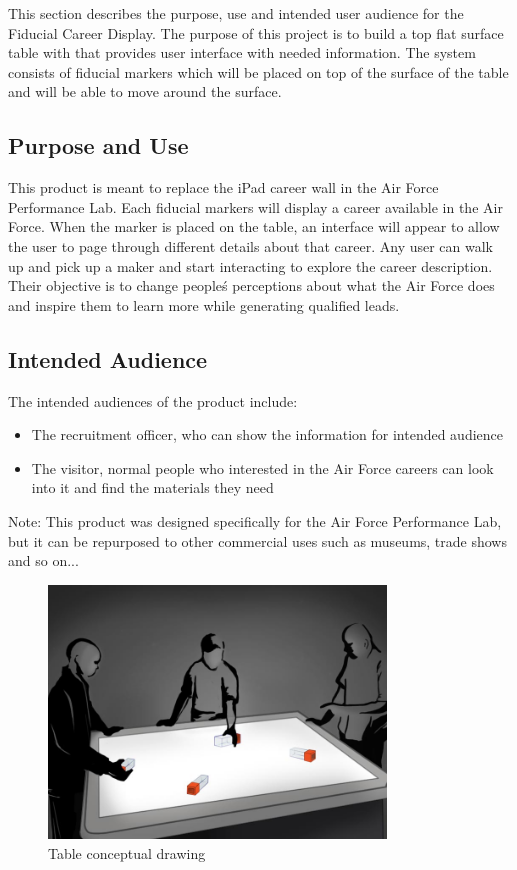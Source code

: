 This section describes the purpose, use and intended user audience for the Fiducial Career Display.
The purpose of this  project is to build a top flat surface table with that  provides user
interface with needed information. The system consists of fiducial markers which will be placed on
top of the surface of the table and will be able to move around the surface.

\subsection{Purpose and Use}
This product is meant to replace the iPad career wall in the Air Force Performance Lab.
Each fiducial markers will display a career available in the Air Force.
When the marker is placed on the table, an interface will appear to allow the user to page through different details about that career.
Any user can walk up and pick up a maker and start interacting to explore the career description.
Their objective is to change people\'s perceptions about what the Air Force does and inspire them to learn more while
generating qualified leads.

\subsection{Intended Audience}
The intended audiences of the product include:
\begin{itemize}
\item The recruitment officer, who can show the information for intended audience
\item The visitor, normal people who interested in the Air Force careers can look into it and find the materials they need
\end{itemize}


Note: This product was designed specifically for the Air Force Performance Lab, but it can be repurposed to other commercial uses such as museums, trade shows and so on...
\begin{figure}[h!]
	\centering
   	\includegraphics[width=0.8\textwidth]{images/Concept_Sketches_03}
    \caption{Table conceptual drawing \cite{concept1}}
\end{figure}
